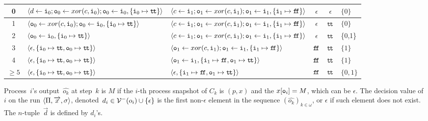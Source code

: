 {\begin{sidewaystable}
\begin{tabular}{cllcc|l}
    0      & $\langle{d\leftarrow \texttt{i}_0; \texttt{o}_0\leftarrow xor(c, \texttt{i}_0); \texttt{o}_0
   \leftarrow \texttt{i}_0, \{\texttt{i}_0\mapsto \texttt{t\kern -1.2pt t}\}}\rangle$
	& $\langle{c\leftarrow \texttt{i}_1; \texttt{o}_1\leftarrow xor(c, \texttt{i}_1); \texttt{o}_1
   \leftarrow \texttt{i}_1, \{\texttt{i}_1\mapsto \texttt{f\kern -1.7pt f}\}}\rangle$
	    & $\epsilon$
		& $\epsilon$
		    & $\{0\}$ \\ \hline
    1      & $\langle{\texttt{o}_0\leftarrow
  xor(c, \texttt{i}_0); \texttt{o}_0
   \leftarrow \texttt{i}_0, \{\texttt{i}_0\mapsto \texttt{t\kern -1.2pt t}\}}\rangle$
	& $\langle{c\leftarrow \texttt{i}_1; \texttt{o}_1\leftarrow xor(c, \texttt{i}_1); \texttt{o}_1
   \leftarrow \texttt{i}_1, \{\texttt{i}_1\mapsto \texttt{f\kern -1.7pt f}\}}\rangle$
	    & $\epsilon$
		& $\texttt{t\kern -1.2pt t}$
		    & $\{0\}$ \\ \hline
    2      & $\langle{\texttt{o}_0
   \leftarrow \texttt{i}_0, \{\texttt{i}_0\mapsto \texttt{t\kern -1.2pt t}\}}\rangle$
	& $\langle{c\leftarrow \texttt{i}_1; \texttt{o}_1\leftarrow xor(c, \texttt{i}_1); \texttt{o}_1
   \leftarrow \texttt{i}_1, \{\texttt{i}_1\mapsto \texttt{f\kern -1.7pt f}\}}\rangle$
	    & $\epsilon$
		& $\texttt{t\kern -1.2pt t}$
		    & \{0,1\} \\ \hline
    3      & $\langle{\epsilon, \{\texttt{i}_0\mapsto \texttt{t\kern -1.2pt t}, \texttt{o}_0 \mapsto \texttt{t\kern -1.2pt t}\}}\rangle$
	& $\langle{\texttt{o}_1\leftarrow xor(c, \texttt{i}_1); \texttt{o}_1
   \leftarrow \texttt{i}_1, \{\texttt{i}_1\mapsto \texttt{f\kern -1.7pt f}\}}\rangle$
	    & $\texttt{f\kern -1.7pt f}$
		& $\texttt{t\kern -1.2pt t}$
		    & $\{1\}$ \\ \hline
    4      & $\langle{\epsilon, \{\texttt{i}_0\mapsto \texttt{t\kern -1.2pt t}, \texttt{o}_0 \mapsto \texttt{t\kern -1.2pt t}\}}\rangle$
	& $\langle{\texttt{o}_1
   \leftarrow \texttt{i}_1, \{\texttt{i}_1\mapsto \texttt{f\kern -1.7pt f}, \texttt{o}_1\mapsto \texttt{t\kern -1.2pt t}\}}\rangle$
	    & $\texttt{f\kern -1.7pt f}$
		& $\texttt{t\kern -1.2pt t}$
		    & $\{1\}$\\ \hline
    $\ge 5$& $\langle{\epsilon, \{\texttt{i}_0\mapsto \texttt{t\kern -1.2pt t}, \texttt{o}_0 \mapsto \texttt{t\kern -1.2pt t}\}}\rangle$
	& $\langle{\epsilon, \{\texttt{i}_1\mapsto \texttt{f\kern -1.7pt f}, \texttt{o}_1\mapsto \texttt{t\kern -1.2pt t}\}}\rangle$
	    & $\texttt{f\kern -1.7pt f}$
		& $\texttt{t\kern -1.2pt t}$
		    & $\{0,1\}$ \\ \hline
   \end{tabular}
  \end{sidewaystable}

Process~$i$'s output~$\hat{o_k}$ at step~$k$ is
$M$ if the $i$-th process snapshot of $C_k$ is
$(p, x)$ and the $x[\texttt{o}_i] = M$, which can be $\epsilon$.
The decision value of $i$ on the run $\langle{\Pi,\overrightarrow x,\sigma}\rangle$,
denoted~$d_i \in \mathcal{V}^-(o_i)\cup\{\epsilon\}$
 is the first non-$\epsilon$ element in the sequence
 $\left(\hat{o_k}\right)_{k\in\omega}$,
 or
$\epsilon$ if such element does not exist.
The $n$-tuple~$\vec d$ is defined by $d_i$'s.

}
